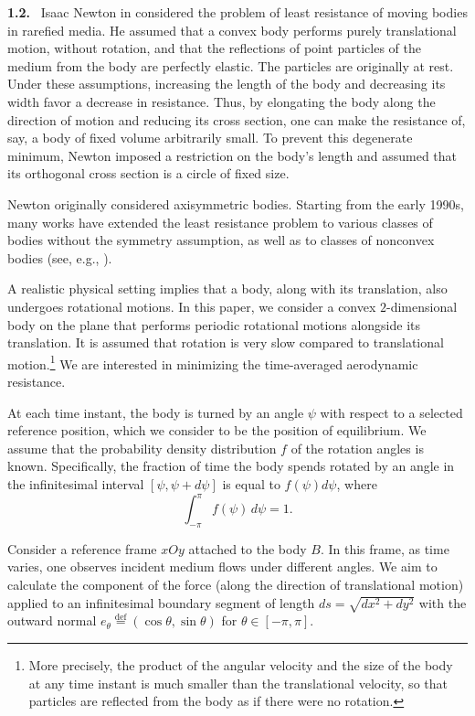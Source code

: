 \documentclass[a4paper,12pt]{article}
\newcommand{\eqdef}{\stackrel{\mathrm{def}}{=}}
\theoremstyle{remark}
\theoremstyle{definition}
\begin{document}
{\bf 1.2.} \ Isaac Newton in \cite{N} considered the problem of least resistance of moving bodies in rarefied media. He assumed that a convex body performs purely translational motion, without rotation, and that the reflections of point particles of the medium from the body are perfectly elastic. The particles are originally at rest. Under these assumptions, increasing the length of the body and decreasing its width favor a decrease in resistance. Thus, by elongating the body along the direction of motion and reducing its cross section, one can make the resistance of, say, a body of fixed volume arbitrarily small. To prevent this degenerate minimum, Newton imposed a restriction on the body's length and assumed that its orthogonal cross section is a circle of fixed size.

Newton originally considered axisymmetric bodies. Starting from the early 1990s, many works have extended the least resistance problem to various classes of bodies without the symmetry assumption, as well as to classes of nonconvex bodies (see, e.g., \cite{BK,BrFK,BFK,CL1,Guasoni,Kaw,LO,LP1,DAN2003,RMS2009,SIC,SIREV,P-sing,P-boundary,W,LZ,LWZ}).

A realistic physical setting implies that a body, along with its translation, also undergoes rotational motions. In this paper, we consider a convex $2$-dimensional body on the plane that performs periodic rotational motions alongside its translation. It is assumed that rotation is very slow compared to translational motion.\footnote{More precisely, the product of the angular velocity and the size of the body at any time instant is much smaller than the translational velocity, so that particles are reflected from the body as if there were no rotation.} We are interested in minimizing the time-averaged aerodynamic resistance.

At each time instant, the body is turned by an angle $\psi$ with respect to a selected reference position, which we consider to be the position of equilibrium. We assume that the probability density distribution $f$ of the rotation angles is known. Specifically, the fraction of time the body spends rotated by an angle in the infinitesimal interval $[\psi, \psi+d\psi]$ is equal to $f(\psi) d\psi$, where
$$\int_{-\pi}^{\pi} f(\psi)\, d\psi = 1.$$

Consider a reference frame $xOy$ attached to the body $B$. In this frame, as time varies, one observes incident medium flows under different angles. We aim to calculate the component of the force (along the direction of translational motion) applied to an infinitesimal boundary segment of length $ds = \sqrt{dx^2 + dy^2}$ with the outward normal $e_\theta \eqdef (\cos\theta,\sin\theta)$ for $\theta \in [-\pi, \pi].$
\end{document}
